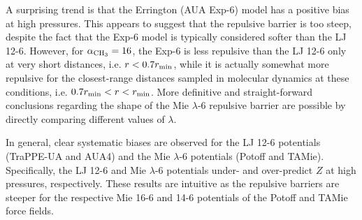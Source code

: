 \documentclass[preprint,letterpaper,floatfix,citeautoscript,aip,jcp]{revtex4-1}
\begin{document}
A surprising trend is that the Errington (AUA Exp-6) model has a positive bias at high pressures. This appears to suggest that the repulsive barrier is too steep, despite the fact that the Exp-6 model is typically considered softer than the LJ 12-6. However, for $\alpha_{\rm CH_3} = 16$, the Exp-6 is less repulsive than the LJ 12-6 only at very short distances, i.e. $r < 0.7 r_{\rm min}$, while it is actually somewhat more repulsive for the closest-range distances sampled in molecular dynamics at these conditions, i.e. $0.7 r_{\rm min} < r < r_{\rm min}$.  
%
More definitive and straight-forward conclusions regarding the shape of the Mie $\lambda$-6 repulsive barrier are possible by directly comparing different values of $\lambda$. 
 
In general, 
clear systematic biases are observed for the LJ 12-6 potentials (TraPPE-UA and AUA4) and the Mie $\lambda$-6 potentials (Potoff and TAMie). Specifically, 
the LJ 12-6 and Mie $\lambda$-6 potentials under- and over-predict $Z$ at high pressures, respectively. These results are intuitive as the repulsive barriers are steeper for the respective Mie 16-6 and 14-6 potentials of the Potoff and TAMie force fields. 


\end{document}
